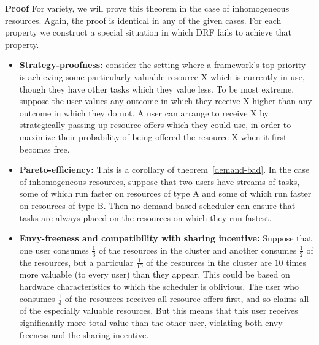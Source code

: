 \documentclass{acm_proc_article-sp}
\begin{document}
\textbf{Proof} For variety, we will prove this theorem in the case of inhomogeneous resources. 
Again, the proof is identical in any of the given cases. For each property we construct a special situation in which DRF fails to achieve that property.
\vspace{-5mm}
\begin{itemize}
\itemsep0em
\item \textbf{Strategy-proofness:} consider the setting where a framework's top priority is achieving some particularly valuable resource X 
which is currently in use, though they have other tasks which they value less. To be most extreme, suppose the user values any outcome in which they receive X 
higher than any outcome in which they do not. 
A user can arrange to receive X by strategically passing up resource offers which they could use, in order to maximize 
their probability of being offered the resource X when it first becomes free. 
\item \textbf{Pareto-efficiency:} This is a corollary of theorem~\ref{demand-bad}. 
In the case of inhomogeneous resources, suppose that two users have streams of tasks, some of which run faster on resources of type A and some of which run faster on resources of type B. 
Then no demand-based scheduler can ensure that tasks are always placed on the resources on which they run fastest.
\item \textbf{Envy-freeness and compatibility with sharing incentive:} Suppose that one user consumes $\frac 13$ of the resources in the cluster and another consumes $\frac 12$ of the resources, 
but a particular $\frac 1{10}$ of the resources in the cluster are $10$ times more valuable (to every user) than they appear. 
This could be based on hardware characteristics to which the scheduler is oblivious. 
The user who consumes $\frac 13$ of the resources receives all resource offers first, and so claims all of the especially valuable resources. 
But this means that this user receives significantly more total value than the other user, violating both envy-freeness and the sharing incentive. 
\end{itemize}
\end{document}
